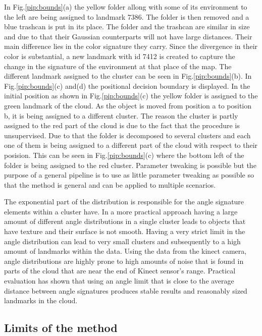 \documentclass[twoside,hidelinks]{article}
\begin{document}
In Fig.\ref{pip:bounds}(a) the yellow folder allong with some of its environment to the left are being assigned to landmark 7386. The folder is then removed and a blue trashcan is put in its place. The folder and the trashcan are similar in size and due to that their Gaussian counterparts will not have large distances. Their main difference lies in the color signature they carry. Since the divergence in their color is substantial, a new landmark with id 7412 is created to capture the change in the signature of the environment at that place of the map. The different landmark assigned to the cluster can be seen in Fig.\ref{pip:bounds}(b). In Fig.\ref{pip:bounds}(c) and(d) the positional decision boundary is displayed. In the initial position as shown in Fig.\ref{pip:bounds}(c) the yellow folder is assigned to the green landmark of the cloud. As the object is moved from position a to position b, it is being assigned to a different cluster. The reason the cluster is partly assigned to the red part of the cloud is due to the fact that the procedure is unsupervised. Due to that the folder is decomposed to several clusters and each one of them is being assigned to a different part of the cloud with respect to their posision. This can be seen in Fig.\ref{pip:bounds}(c) where the bottom left of the folder is being assigned to the red cluster. Parameter tweaking is possible but the purpose of a general pipeline is to use as little parameter tweaking as possible so that the method is general and can be applied to multiple scenarios.

The exponential part of the distribution is responsible for the angle signature elements within a cluster have. In a more practical approach having a large amount of different angle distributions in a single cluster leads to objects that have texture and their surface is not smooth. Having a very strict limit in the angle distribution can lead to very small clusters and subsequently to a high amount of landmarks within the data. Using the data from the kinect camera, angle distributions are highly prone to high amounts of noise that is found in parts of the cloud that are near the end of Kinect sensor's range. Practical evaluation has shown that using an angle limit that is close to the average distance between angle signatures produces stable results and reasonably sized landmarks in the cloud.


\subsection{Limits of the method}
\end{document}
